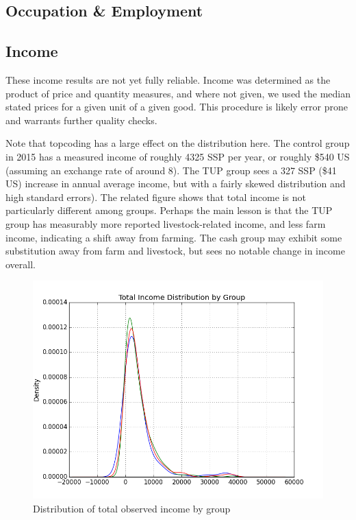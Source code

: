 \documentclass[11pt]{article}
\begin{document}
\subsection{Occupation \& Employment}
\label{sec:orgheadline22}
\subsection{Income}
\label{sec:orgheadline23}

These income results are not yet fully reliable. Income was determined as the product
of price and quantity measures, and where not given, we used the median stated prices
for a given unit of a given good. This procedure is likely error prone and warrants
further quality checks.

Note that topcoding has a large effect on the distribution here. The control group in
2015 has a measured income of roughly 4325 SSP per year, or roughly \$540 US (assuming
an exchange rate of around 8). The TUP group sees a 327 SSP (\$41 US) increase in
annual average income, but with a fairly skewed distribution and high standard
errors). The related figure shows that total income is not particularly different
among groups. Perhaps the main lesson is that the TUP group has measurably more
reported livestock-related income, and less farm income, indicating a shift away from
farming. The cash group may exhibit some substitution away from farm and livestock,
but sees no notable change in income overall. 

\begin{figure}[htb]
\centering
\includegraphics[width=.9\linewidth]{../figures/IncomeDistribution.png}
\caption{\label{fig:orgparagraph1}
Distribution of total observed income by group}
\end{figure} 
\end{document}

